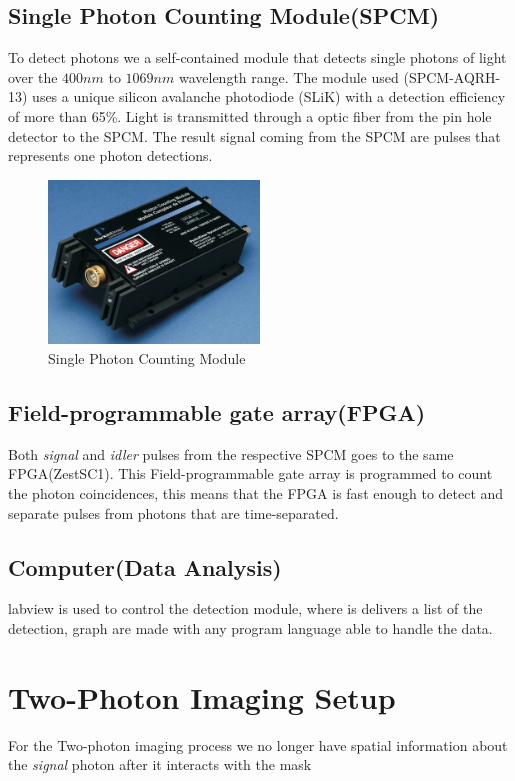 \subsection{Single Photon Counting Module(SPCM)}
To detect photons we a self-contained module that detects single photons of light over the $400nm$ to $1069 nm$
wavelength range. The module used (SPCM-AQRH-13) uses a unique silicon avalanche photodiode (SLiK) with a detection efficiency of more than 65\%\cite{spcm}.
Light is transmitted through a optic fiber from the pin hole detector to the SPCM. The result signal coming
from the SPCM are pulses that represents one photon detections.
\begin{figure}[h]
\centering
\includegraphics[width=0.5\textwidth]{Figures/spcm.png}
\caption{Single Photon Counting Module} 
\label{fig:spcm}
\end{figure}
\subsection{Field-programmable gate array(FPGA)}
Both \textit{signal} and \textit{idler} pulses from the respective SPCM goes to the same FPGA(ZestSC1). This Field-programmable gate array is programmed
to count the photon coincidences, this means that the FPGA is fast enough to detect and separate pulses from photons 
that are time-separated. 




\subsection{Computer(Data Analysis)}
labview is used to control the detection module, where is delivers a list of the detection, graph are made with any 
program language able to handle the data.


\section{Two-Photon Imaging Setup}
For the Two-photon imaging process we no longer have spatial information about the \textit{signal} photon after it interacts
with the mask  
